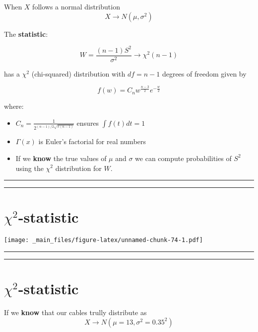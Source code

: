 \documentclass[
]{book}
\begin{document}
When \(X\) follows a normal distribution
\[X \rightarrow N(\mu, \sigma^2)\]

The \textbf{statistic}:

\[W=\frac{(n-1)S^2}{\sigma^2} \rightarrow \chi^2(n-1)\]

has a \(\chi^2\) (chi-squared) distribution with \(df=n-1\) degrees of freedom given by

\[f(w)=C_n  w^{\frac{n-3}{2}} e^{-\frac{w}{2}}\]

where:

\begin{itemize}
\item
  \(C_n=\frac{1}{2^{(n-1)/2\sqrt{\pi(n-1)}}}\) ensures \(\int f(t)dt=1\)
\item
  \(\Gamma(x)\) is Euler's factorial for real numbers
\item
  If we \textbf{know} the true values of \(\mu\) and \(\sigma\) we can compute probabilities of \(S^2\) using the \(\chi^2\) distribution for \(W\).
\end{itemize}

\begin{center}\rule{0.5\linewidth}{0.5pt}\end{center}

\begin{center}\rule{0.5\linewidth}{0.5pt}\end{center}

\hypertarget{chi2-statistic}{%
\section{\texorpdfstring{\(\chi^2\)-statistic}{\textbackslash chi\^{}2-statistic}}\label{chi2-statistic}}

\texttt{[image: \_main\_files/figure-latex/unnamed-chunk-74-1.pdf]}

\begin{center}\rule{0.5\linewidth}{0.5pt}\end{center}

\begin{center}\rule{0.5\linewidth}{0.5pt}\end{center}

\hypertarget{chi2-statistic-1}{%
\section{\texorpdfstring{\(\chi^2\)-statistic}{\textbackslash chi\^{}2-statistic}}\label{chi2-statistic-1}}

If we \textbf{know} that our cables trully distribute as \[X \rightarrow N(\mu=13, \sigma^2=0.35^2)\]
\end{document}
